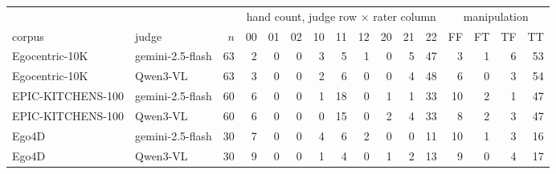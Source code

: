 \begin{tabular}{@{}llr rrrrrrrrr rrrr@{}}
\toprule
& & & \multicolumn{9}{c}{hand count, judge row $\times$ rater column} & \multicolumn{4}{c}{manipulation} \\
\cmidrule(lr){4-12}\cmidrule(lr){13-16}
corpus & judge & $n$ & 00 & 01 & 02 & 10 & 11 & 12 & 20 & 21 & 22 & FF & FT & TF & TT \\
\midrule
Egocentric-10K & gemini-2.5-flash & 63 & 2 & 0 & 0 & 3 & 5 & 1 & 0 & 5 & 47 & 3 & 1 & 6 & 53 \\
Egocentric-10K & Qwen3-VL & 63 & 3 & 0 & 0 & 2 & 6 & 0 & 0 & 4 & 48 & 6 & 0 & 3 & 54 \\
EPIC-KITCHENS-100 & gemini-2.5-flash & 60 & 6 & 0 & 0 & 1 & 18 & 0 & 1 & 1 & 33 & 10 & 2 & 1 & 47 \\
EPIC-KITCHENS-100 & Qwen3-VL & 60 & 6 & 0 & 0 & 0 & 15 & 0 & 2 & 4 & 33 & 8 & 2 & 3 & 47 \\
Ego4D & gemini-2.5-flash & 30 & 7 & 0 & 0 & 4 & 6 & 2 & 0 & 0 & 11 & 10 & 1 & 3 & 16 \\
Ego4D & Qwen3-VL & 30 & 9 & 0 & 0 & 1 & 4 & 0 & 1 & 2 & 13 & 9 & 0 & 4 & 17 \\
\bottomrule
\end{tabular}
